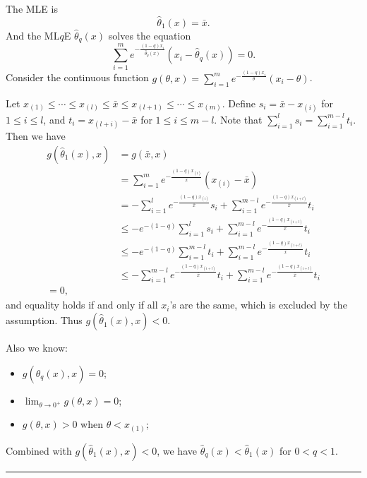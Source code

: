 \documentclass[a4paper]{article}
\newenvironment{proof}{{\bf Proof:  }}{\hfill\rule{2mm}{2mm}}
\begin{document}
\begin{proof}
The MLE is
\[
	\hat{\theta}_1(x) = \bar{x}.
\]
And the ML$q$E $\hat{\theta}_q(x)$ solves the equation
\[
	\sum_{i=1}^m e^{-\frac{(1-q)x_i}{\hat{\theta}_q(x)}}(x_i - \hat{\theta}_q(x)) = 0.
\]
Consider the continuous function $g(\theta, x) = \sum_{i=1}^m e^{-\frac{(1-q)x_i}{\theta}}(x_i - \theta)$. 

Let $x_{(1)} \le \cdots \le x_{(l)} \le \bar{x} \le x_{(l+1)} \le \cdots \le x_{(m)}$. Define $s_i = \bar{x} - x_{(i)}$ for $1 \le i \le l$, and $t_{i} = x_{(l+i)} - \bar{x}$ for $1 \le i \le m - l$. Note that $\sum_{i=1}^l s_i = \sum_{i=1}^{m-l} t_i$. Then we have
\begin{align*}
g(\hat{\theta}_1(x), x) & = g(\bar{x}, x) \\
& = \sum_{i=1}^m e^{-\frac{(1-q)x_{(i)}}{\bar{x}}}(x_{(i)} - \bar{x}) \\
& = - \sum_{i=1}^l e^{-\frac{(1-q)x_{(i)}}{\bar{x}}}s_i
+ \sum_{i=1}^{m-l} e^{-\frac{(1-q)x_{(i+l)}}{\bar{x}}}t_i\\
& \le - e^{-(1-q)} \sum_{i=1}^l s_i
+ \sum_{i=1}^{m-l} e^{-\frac{(1-q)x_{(i+l)}}{\bar{x}}}t_i\\
& \le - e^{-(1-q)} \sum_{i=1}^{m-l} t_i
+ \sum_{i=1}^{m-l} e^{-\frac{(1-q)x_{(i+l)}}{\bar{x}}}t_i\\
& \le - \sum_{i=1}^{m-l} e^{-\frac{(1-q)x_{(i+l)}}{\bar{x}}}t_i
+ \sum_{i=1}^{m-l} e^{-\frac{(1-q)x_{(i+l)}}{\bar{x}}}t_i\\
= 0,
\end{align*}
and equality holds if and only if all $x_i$'s are the same, which is excluded by the assumption.
Thus $g(\hat{\theta}_1(x), x) < 0$.

Also we know:
\begin{itemize}
\item $g(\hat{\theta}_q(x), x) = 0$;
\item $\lim_{\theta \rightarrow 0^+}g(\theta, x) = 0$;
\item $g(\theta, x) > 0$ when $\theta < x_{(1)}$;
\end{itemize}
Combined with $g(\hat{\theta}_1(x), x) < 0$, we have $\hat{\theta}_q(x) < \hat{\theta}_1(x)$ for $0 < q < 1$.
\end{proof}
\end{document}
